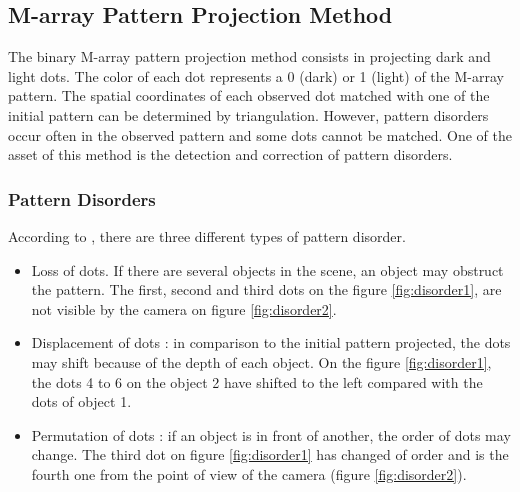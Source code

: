 \subsection{M-array Pattern Projection Method \cite{morita1988reconstruction}}

The binary M-array pattern projection method consists in projecting dark and light dots. The color of each dot represents a 0 (dark) or 1 (light) of the M-array pattern. The spatial coordinates of each observed dot matched with one of the initial pattern can be determined by triangulation. However, pattern disorders occur often in the observed pattern and some dots cannot be matched. One of the asset of this method is the detection and correction of pattern disorders.

\subsubsection{Pattern Disorders}
\label{PatternDisorders}
According to \cite{morita1988reconstruction}, there are three different types of pattern disorder.
\begin{itemize}
\item Loss of dots. If there are several objects in the scene, an object may obstruct the pattern. The first, second and third dots on the figure \ref{fig:disorder1}, are not visible by the camera on figure \ref{fig:disorder2}.
\item Displacement of dots : in comparison to the initial pattern projected, the dots may shift because of the depth of each object. On the figure \ref{fig:disorder1}, the dots 4 to 6 on the object 2 have shifted to the left compared with the dots of object 1.
\item Permutation of dots : if an object is in front of another, the order of dots may change. The third dot on figure \ref{fig:disorder1} has changed of order and is the fourth one from the point of view of the camera (figure \ref{fig:disorder2}).
\end{itemize}

